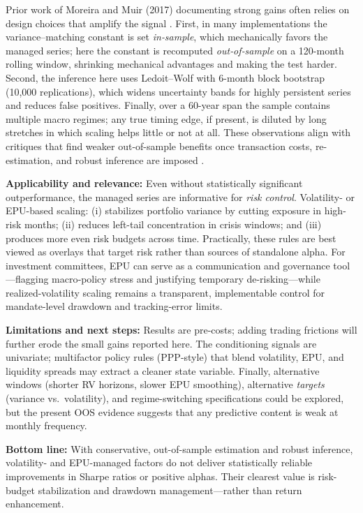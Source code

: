 Prior work of Moreira and Muir (2017) documenting strong gains often relies on design choices that amplify the signal \citep{moreira2017}. First, in many implementations the variance–matching constant is set \emph{in‐sample}, which mechanically favors the managed series; here the constant is recomputed \emph{out‐of‐sample} on a 120-month rolling window, shrinking mechanical advantages and making the test harder. Second, the inference here uses Ledoit–Wolf with 6-month block bootstrap (10{,}000 replications), which widens uncertainty bands for highly persistent series and reduces false positives. Finally, over a 60-year span the sample contains multiple macro regimes; any true timing edge, if present, is diluted by long stretches in which scaling helps little or not at all. These observations align with critiques that find weaker out-of-sample benefits once transaction costs, re-estimation, and robust inference are imposed \citep{cederburg2020,barroso2021}.

\textbf{Applicability and relevance:} Even without statistically significant outperformance, the managed series are informative for \emph{risk control}. Volatility- or EPU-based scaling:
(i) stabilizes portfolio variance by cutting exposure in high-risk months;
(ii) reduces left-tail concentration in crisis windows; and
(iii) produces more even risk budgets across time. Practically, these rules are best viewed as overlays that target risk rather than sources of standalone alpha. For investment committees, EPU can serve as a communication and governance tool—flagging macro‐policy stress and justifying temporary de-risking—while realized-volatility scaling remains a transparent, implementable control for mandate-level drawdown and tracking-error limits.

\textbf{Limitations and next steps:} Results are pre-costs; adding trading frictions will further erode the small gains reported here. The conditioning signals are univariate; multifactor policy rules (PPP-style) that blend volatility, EPU, and liquidity spreads may extract a cleaner state variable. Finally, alternative windows (shorter RV horizons, slower EPU smoothing), alternative \emph{targets} (variance vs.\ volatility), and regime-switching specifications could be explored, but the present OOS evidence suggests that any predictive content is weak at monthly frequency.

\textbf{Bottom line:} With conservative, out-of-sample estimation and robust inference, volatility- and EPU-managed factors do not deliver statistically reliable improvements in Sharpe ratios or positive alphas. Their clearest value is risk-budget stabilization and drawdown management—rather than return enhancement.

